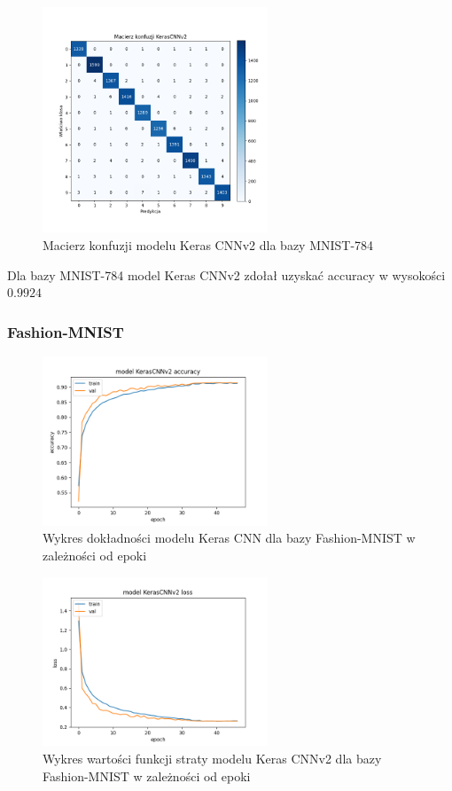 \documentclass{article}
\begin{document}
\begin{figure}[H]
	\centering
	\includegraphics[width=0.6\textwidth]{../Saves/KerasCNNV2/mnist-784/KerasCNNV2_mnist_784_conf_mat.png}
	\caption{Macierz konfuzji modelu Keras CNNv2 dla bazy MNIST-784}
\end{figure}
Dla bazy MNIST-784 model Keras CNNv2 zdołał uzyskać accuracy w wysokości $0.9924$

\subsubsection{Fashion-MNIST}
\begin{figure}[H]
    \centering
    \includegraphics[width=0.6\textwidth]{../Saves/KerasCNNV2/fashion-mnist/KerasCNNV2_fashion-mnist_ep47_acc.png}
    \caption{Wykres dokładności modelu Keras CNN dla bazy Fashion-MNIST w zależności od epoki}
\end{figure}

\begin{figure}[H]
    \centering
    \includegraphics[width=0.6\textwidth]{../Saves/KerasCNNV2/fashion-mnist/KerasCNNV2_fashion-mnist_ep47_loss.png}
    \caption{Wykres wartości funkcji straty modelu Keras CNNv2 dla bazy Fashion-MNIST w zależności od epoki}
\end{figure}
\end{document}
